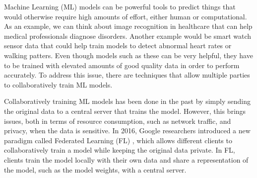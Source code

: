 
Machine Learning (ML) models can be powerful tools to predict things that would otherwise require high amounts of effort, either human or computational. As an example, we can think about image recognition in healthcare that can help medical professionals diagnose disorders. Another example would be smart watch sensor data that could help train models to detect abnormal heart rates or walking patters. Even though models such as these can be very helpful, they have to be trained with elevated amounts of good quality data in order to perform accurately. To address this issue, there are techniques that allow multiple parties to collaboratively train ML models.

Collaboratively training ML models has been done in the past by simply sending the original data to a central server that trains the model. However, this brings issues, both in terms of resource consumption, such as network traffic, and privacy, when the data is sensitive. In 2016, Google researchers introduced a new paradigm called Federated Learning (FL) \cite{10.48550/arxiv.1602.05629}, which allows different clients to collaboratively train a model while keeping the original data private. In FL, clients train the model locally with their own data and share a representation of the model, such as the model weights, with a central server. 


    
    
